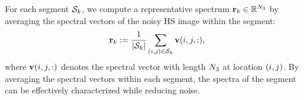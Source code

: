 For each segment $\mathcal{S}_{k}$, we compute a representative spectrum $\mathbf{r}_{k} \in \mathbb{R}^{N_{3}}$ by averaging the spectral vectors of the noisy HS image within the segment:
\begin{equation}
    \label{eq:SpectrumRep}
    \mathbf{r}_{k} := \frac{1}{|\mathcal{S}_{k}|} \sum_{(i, j) \in \mathcal{S}_{k}} \mathbf{v}(i, j, :),
\end{equation}
where $\mathbf{v}(i, j, :)$ denotes the spectral vector with length $N_{3}$ at location $(i, j)$. By averaging the spectral vectors within each segment, the spectra of the segment can be effectively characterized while reducing noise.


